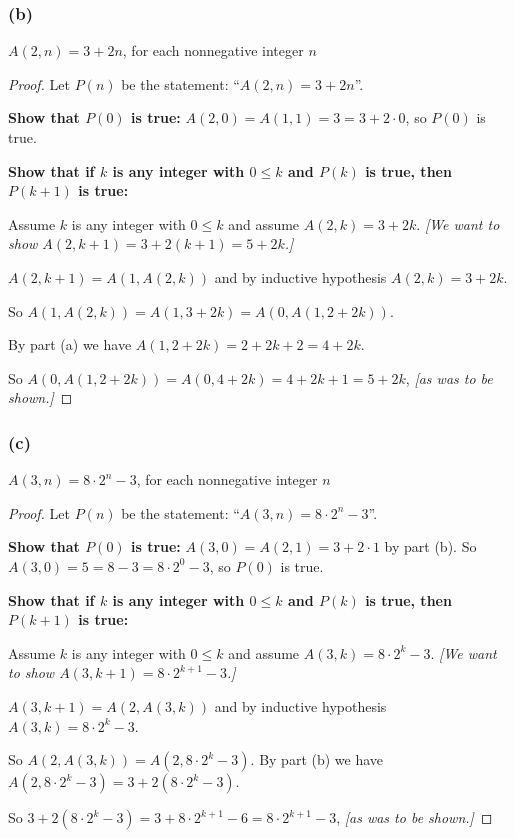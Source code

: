 \documentclass[14pt]{extarticle}
\begin{document}
\subsubsection{(b)}
\(A(2, n) = 3 + 2n\), for each nonnegative integer $n$

\begin{proof}
    Let $P(n)$ be the statement: ``\(A(2, n) = 3 + 2n\)''.

    {\bf Show that $P(0)$ is true:} \(A(2, 0) = A(1, 1) = 3 = 3 + 2 \cdot 0\), so $P(0)$ is true.

        {\bf Show that if $k$ is any integer with \(0 \leq k\) and $P(k)$ is true, then $P(k+1)$ is true:}

    Assume $k$ is any integer with \(0 \leq k\) and assume \(A(2, k) = 3 + 2k\).
        {\it [We want to show \(A(2, k+1) = 3+2(k+1) = 5+2k\).]}

    \(A(2, k+1) = A(1, A(2, k))\) and by inductive hypothesis \(A(2, k) = 3+2k\).

    So \(A(1, A(2, k)) = A(1, 3+2k) = A(0, A(1, 2+2k))\).

    By part (a) we have \(A(1, 2+2k) = 2+2k+2 = 4+2k\).

    So \(A(0, A(1, 2+2k)) = A(0, 4+2k) = 4+2k+1 = 5+2k\), {\it [as was to be shown.]}
\end{proof}

\subsubsection{(c)}
\(A(3, n) = 8 \cdot 2^n - 3\), for each nonnegative integer $n$

\begin{proof}
    Let $P(n)$ be the statement: ``\(A(3, n) = 8 \cdot 2^n - 3\)''.

    {\bf Show that $P(0)$ is true:} \(A(3, 0) = A(2, 1) = 3 + 2 \cdot 1\) by part (b).
    So \(A(3, 0) = 5 = 8 - 3 = 8 \cdot 2^0 - 3\), so $P(0)$ is true.

        {\bf Show that if $k$ is any integer with \(0 \leq k\) and $P(k)$ is true, then $P(k+1)$ is true:}

    Assume $k$ is any integer with \(0 \leq k\) and assume \(A(3, k) = 8 \cdot 2^k - 3\).
        {\it [We want to show \(A(3, k+1) = 8 \cdot 2^{k+1}-3\).]}

    \(A(3, k+1) = A(2, A(3, k))\) and by inductive hypothesis \(A(3, k) = 8 \cdot 2^k - 3\).

    So \(A(2, A(3, k)) = A(2, 8 \cdot 2^k - 3)\). By part (b) we have \(A(2, 8 \cdot 2^k - 3) = 3 + 2(8 \cdot 2^k - 3)\).

    So \(3 + 2(8 \cdot 2^k - 3) = 3 + 8 \cdot 2^{k+1} - 6 = 8 \cdot 2^{k+1} - 3\), {\it [as was to be shown.]}
\end{proof}
\end{document}
